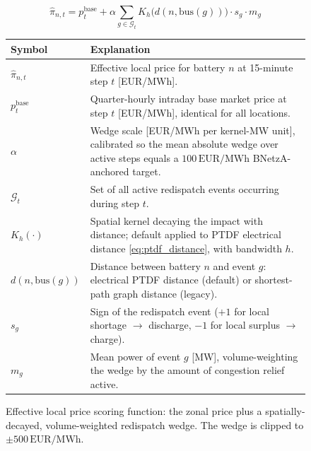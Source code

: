\begin{figure}[htbp]
    \centering
    \begin{equation}
        \hat{\pi}_{n,t} = p^{\text{base}}_t + \alpha \sum_{g \in \mathcal{G}_t} K_h\!\big(d(n, \text{bus}(g))\big) \cdot s_g \cdot m_g
        \label{eq:wedge_scoring_function}
    \end{equation}

    \vspace{0.5em}

    \begin{tabular}{lp{10cm}}
        \textbf{Symbol} & \textbf{Explanation} \\
        \hline
        $\hat{\pi}_{n,t}$ & Effective local price for battery $n$ at 15-minute step $t$ [EUR/MWh]. \\
        $p^{\text{base}}_t$ & Quarter-hourly intraday base market price at step $t$ [EUR/MWh], identical for all locations. \\
        $\alpha$ & Wedge scale [EUR/MWh per kernel-MW unit], calibrated so the mean absolute wedge over active steps equals a $100\,\text{EUR/MWh}$ BNetzA-anchored target. \\
        $\mathcal{G}_t$ & Set of all active redispatch events occurring during step $t$. \\
        $K_h(\cdot)$ & Spatial kernel decaying the impact with distance; default applied to PTDF electrical distance \eqref{eq:ptdf_distance}, with bandwidth $h$. \\
        $d(n, \text{bus}(g))$ & Distance between battery $n$ and event $g$: electrical PTDF distance (default) or shortest-path graph distance (legacy). \\
        $s_g$ & Sign of the redispatch event ($+1$ for local shortage $\rightarrow$ discharge, $-1$ for local surplus $\rightarrow$ charge). \\
        $m_g$ & Mean power of event $g$ [MW], volume-weighting the wedge by the amount of congestion relief active. \\
    \end{tabular}

    \caption{Effective local price scoring function: the zonal price plus a spatially-decayed, volume-weighted redispatch wedge. The wedge is clipped to $\pm 500\,\text{EUR/MWh}$.}
    \label{fig:wedge_scoring_function}
\end{figure}
